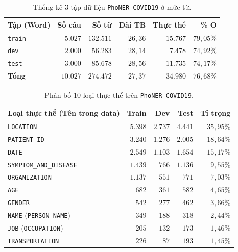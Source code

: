 \documentclass[11pt,a4paper,twocolumn]{article}
\begin{document}
\begin{table}[h]
\centering
\small
\begin{tabular}{lrrrrr}
\hline
\textbf{Tập (Word)} & \textbf{Số câu} & \textbf{Số từ} & \textbf{Dài TB} & \textbf{Thực thể} & \textbf{\% O} \\
\hline
\texttt{train} & $5.027$ & $132.511$ & $26{,}36$ & $15.767$ & $79{,}05\%$ \\
\texttt{dev}   & $2.000$ & $56.283$  & $28{,}14$ & $7.478$  & $74{,}92\%$ \\
\texttt{test}  & $3.000$ & $85.678$  & $28{,}56$ & $11.735$ & $74{,}17\%$ \\
\hline
\textbf{Tổng}  & $10.027$& $274.472$ & $27{,}37$ & $34.980$ & $76{,}68\%$ \\
\hline
\end{tabular}
\caption{Thống kê $3$ tập dữ liệu \texttt{PhoNER\_COVID19} ở mức từ.}
\label{tab:prop_splits}
\end{table}

\begin{table}[h]
\centering
\small
\begin{tabular}{lrrrr}
\hline
\textbf{Loại thực thể (Tên trong data)} & \textbf{Train} & \textbf{Dev} & \textbf{Test} & \textbf{Tỉ trọng} \\
\hline
\texttt{LOCATION}              & $5.398$ & $2.737$ & $4.441$ & $35{,}95\%$ \\
\texttt{PATIENT\_ID}           & $3.240$ & $1.276$ & $2.005$ & $18{,}64\%$ \\
\texttt{DATE}                  & $2.549$ & $1.103$ & $1.654$ & $15{,}17\%$ \\
\texttt{SYMPTOM\_AND\_DISEASE} & $1.439$ & $766$   & $1.136$ & $9{,}55\%$  \\
\texttt{ORGANIZATION}          & $1.137$ & $551$   & $771$   & $7{,}03\%$  \\
\texttt{AGE}                   & $682$   & $361$   & $582$   & $4{,}65\%$  \\
\texttt{GENDER}                & $542$   & $277$   & $462$   & $3{,}66\%$  \\
\texttt{NAME} (\texttt{PERSON\_NAME}) & $349$ & $188$ & $318$ & $2{,}44\%$  \\
\texttt{JOB} (\texttt{OCCUPATION})    & $205$ & $132$ & $173$ & $1{,}46\%$  \\
\texttt{TRANSPORTATION}        & $226$   & $87$    & $193$   & $1{,}45\%$  \\
\hline
\end{tabular}
\caption{Phân bố $10$ loại thực thể trên \texttt{PhoNER\_COVID19}.}
\label{tab:prop_entities}
\end{table}
\end{document}
